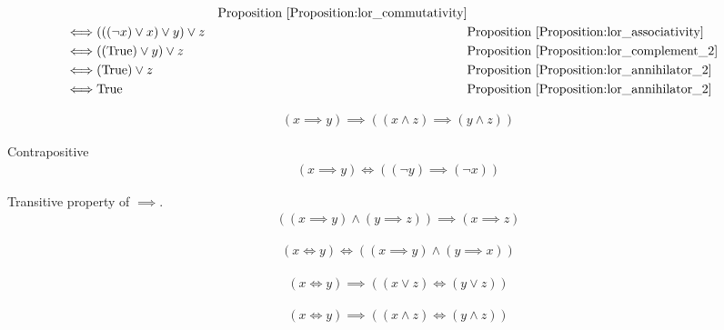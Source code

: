 \begin{prop}
\begin{align*}
&& \text{Proposition \ref{Proposition:lor_commutativity}} \\
\iff & (((\lnot x) \lor x) \lor y) \lor z
&& \text{Proposition \ref{Proposition:lor_associativity}} \\
\iff & ((\text{True}) \lor y) \lor z
&& \text{Proposition \ref{Proposition:lor_complement_2}} \\
\iff & (\text{True}) \lor z
&& \text{Proposition \ref{Proposition:lor_annihilator_2}} \\
\iff & \text{True}
&& \text{Proposition \ref{Proposition:lor_annihilator_2}} \\
\end{align*}
\end{prop}

\begin{prop}
\label{Proposition:implies_land}
\begin{align*}
(x \implies y) \implies ((x \land z) \implies (y \land z))
\end{align*}
\end{prop}

\begin{prop}
\label{Proposition:contrapositive}
Contrapositive
\begin{align*}
(x \implies y) \iff ((\lnot y) \implies (\lnot x))
\end{align*}
\end{prop}

\begin{prop}
\label{Proposition:implies_transitive}
Transitive property of $\implies$.
\begin{align*}
((x \implies y) \land (y \implies z)) \implies (x \implies z)
\end{align*}
\end{prop}

\begin{prop}
\begin{align*}
(x \iff y) \iff ((x \implies y) \land (y \implies x))
\end{align*}
\end{prop}

\begin{prop}
\label{Proposition:iff_lor}
\begin{align*}
(x \iff y) \implies ((x \lor z) \iff (y \lor z))
\end{align*}
\end{prop}

\begin{prop}
\label{Proposition:iff_land}
\begin{align*}
(x \iff y) \implies ((x \land z) \iff (y \land z))
\end{align*}
\end{prop}

